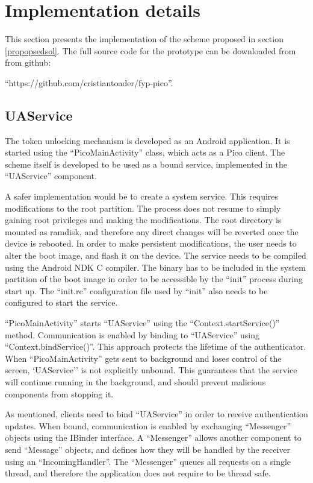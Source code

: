 \section{Implementation details}
This section presents the implementation of the scheme proposed in section \ref{propopsedsol}. The full source code for the prototype can be downloaded from from github: 

``https://github.com/cristiantoader/fyp-pico''.

\subsection{UAService}
The token unlocking mechanism is developed as an Android application. It is started using the ``PicoMainActivity'' class, which acts as a Pico client. The scheme itself is developed to be used as a bound service, implemented in the ``UAService'' component.

A safer implementation would be to create a system service. This requires modifications to the root partition. The process does not resume to simply gaining root privileges and making the modifications. The root directory is mounted as ramdisk, and therefore any direct changes will be reverted once the device is rebooted. In order to make persistent modifications, the user needs to alter the boot image, and flash it on the device. The service needs to be compiled using the Android NDK C compiler. The binary has to be included in the system partition of the boot image in order to be accessible by the ``init'' process during start up. The ``init.rc'' configuration file used by ``init'' also needs to be configured to start the service.

``PicoMainActivity'' starts ``UAService'' using the ``Context.startService()'' method. Communication is enabled by binding to ``UAService'' using ``Context.bindService()''. This approach protects the lifetime of the authenticator. When ``PicoMainActivity'' gets sent to background and loses control of the screen, `UAService'' is not explicitly unbound. This guarantees that the service will continue running in the background, and should prevent malicious components from stopping it. 

As mentioned, clients need to bind ``UAService'' in order to receive authentication updates. When bound, communication is enabled by exchanging ``Messenger'' objects using the IBinder interface. A ``Messenger'' allows another component to send ``Message'' objects, and defines how they will be handled by the receiver using an ``IncomingHandler''. The ``Messenger'' queues all requests on a single thread, and therefore the application does not require to be thread safe. 


